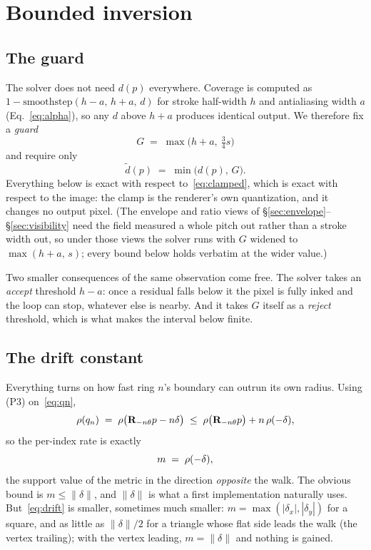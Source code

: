 \section{Bounded inversion}
\label{sec:inverse}

\subsection{The guard}
\label{sec:guard}

The solver does not need $d(p)$ everywhere. Coverage is computed as
$1-\mathrm{smoothstep}(h-a,\,h+a,\,d)$ for stroke half-width $h$ and
antialiasing width $a$ (Eq.~\ref{eq:alpha}), so any $d$ above $h+a$ produces
identical output. We therefore fix a \emph{guard}
\begin{equation}
  G \;=\; \max\bigl(h+a,\ \tfrac{3}{4}s\bigr)
  \label{eq:guard}
\end{equation}
and require only
\begin{equation}
  \tilde d(p) \;=\; \min\bigl(d(p),\, G\bigr).
  \label{eq:clamped}
\end{equation}
Everything below is exact with respect to~\eqref{eq:clamped}, which is exact with
respect to the image: the clamp is the renderer's own quantization, and it
changes no output pixel. (The envelope and ratio views of
\S\ref{sec:envelope}--\S\ref{sec:visibility} need the field measured a whole
pitch out rather than a stroke width out, so under those views the solver runs
with $G$ widened to $\max(h+a,\,s)$; every bound below holds verbatim at the
wider value.)

Two smaller consequences of the same observation come free. The solver takes an
\emph{accept} threshold $h-a$: once a residual falls
below it the pixel is fully inked and the loop can stop, whatever else is nearby.
And it takes $G$ itself as a \emph{reject} threshold, which is what makes the
interval below finite.

\subsection{The drift constant}
\label{sec:drift}

Everything turns on how fast ring $n$'s boundary can outrun its own radius. Using
(P3) on~\eqref{eq:qn},
\begin{equation}
  \rho(q_n) \;=\; \rho\bigl(\mathbf{R}_{-n\theta}p - n\delta\bigr)
    \;\le\; \rho\bigl(\mathbf{R}_{-n\theta}p\bigr) + n\,\rho(-\delta),
  \label{eq:driftup}
\end{equation}
so the per-index rate is exactly
\begin{equation}
  m \;=\; \rho(-\delta),
  \label{eq:drift}
\end{equation}
the support value of the metric in the direction \emph{opposite} the walk. The
obvious bound is $m \le \lVert\delta\rVert$, and $\lVert\delta\rVert$ is what a
first implementation naturally uses. But~\eqref{eq:drift} is smaller, sometimes
much smaller: $m=\max(|\delta_x|,|\delta_y|)$ for a square, and as little as
$\lVert\delta\rVert/2$ for a triangle whose flat side leads the walk (the
vertex trailing); with the vertex leading, $m=\lVert\delta\rVert$ and nothing
is gained.

